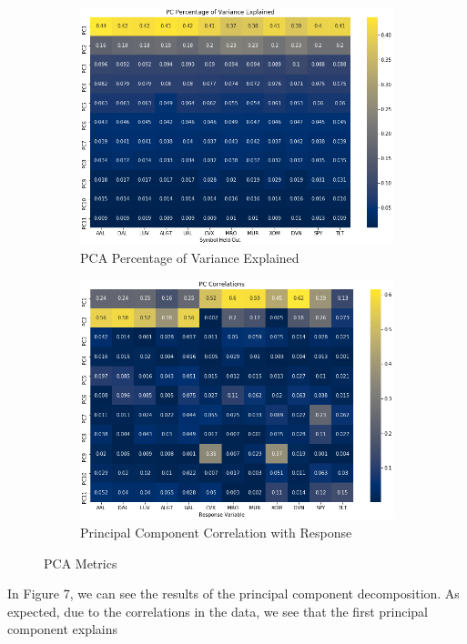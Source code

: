 \documentclass{article}
\begin{document}
\begin{figure}[h!]
  \centering
  \begin{subfigure}{.5\textwidth}
    \centering
    \includegraphics[width=.95\linewidth]{../Figures/PCA_pve.png}
    \caption{PCA Percentage of Variance Explained}
  \end{subfigure}%
  \begin{subfigure}{.5\textwidth}
    \centering
    \includegraphics[width=.95\linewidth]{../Figures/PCA_corr_resp.png}
    \caption{Principal Component Correlation with Response}
  \end{subfigure}
  \caption{PCA Metrics}
\end{figure}
In Figure 7, we can see the results of the principal component decomposition. As expected,
due to the correlations in the data, we see that the first principal component explains
\end{document}
